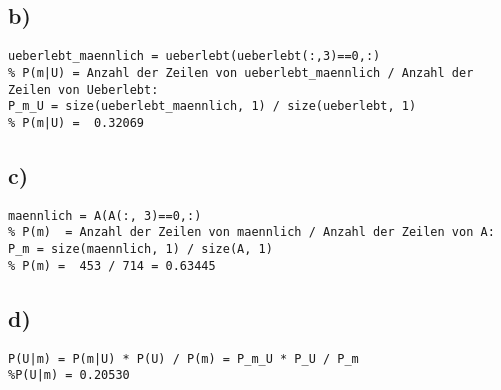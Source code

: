\documentclass{article}
\begin{document}
\subsection*{b)}

\begin{verbatim}
ueberlebt_maennlich = ueberlebt(ueberlebt(:,3)==0,:)
% P(m|U) = Anzahl der Zeilen von ueberlebt_maennlich / Anzahl der Zeilen von Ueberlebt:
P_m_U = size(ueberlebt_maennlich, 1) / size(ueberlebt, 1)
% P(m|U) =  0.32069
\end{verbatim}

\subsection*{c)}

\begin{verbatim}
maennlich = A(A(:, 3)==0,:)
% P(m)  = Anzahl der Zeilen von maennlich / Anzahl der Zeilen von A:
P_m = size(maennlich, 1) / size(A, 1)
% P(m) =  453 / 714 = 0.63445
\end{verbatim}

\subsection*{d)}

\begin{verbatim}
P(U|m) = P(m|U) * P(U) / P(m) = P_m_U * P_U / P_m
%P(U|m) = 0.20530
\end{verbatim}
\end{document}
